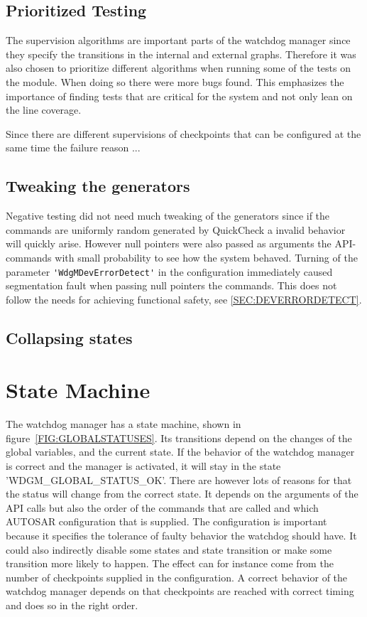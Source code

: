 \subsection{Prioritized Testing}
The supervision algorithms are important parts of the watchdog manager since
they specify the transitions in the internal and external graphs. Therefore it
was also chosen to prioritize different algorithms when running some of the
tests on the module. When doing so there were more bugs found. This emphasizes
the importance of finding tests that are critical for the system and not only
lean on the line coverage.

Since there are different supervisions of checkpoints that can be
configured at the same time the failure reason ...

\subsection{Tweaking the generators}
Negative testing did not need much tweaking of the generators since if
the commands are uniformly random generated by QuickCheck a invalid
behavior will quickly arise. However null pointers were also
passed as arguments the API-commands with small probability to see how
the system behaved. Turning of the parameter
\lstinline!'WdgMDevErrorDetect'! in the configuration immediately caused segmentation
fault when passing null pointers the commands. This does not follow
the needs for achieving functional safety, see \ref{SEC:DEVERRORDETECT}.


\subsection{Collapsing states}



\section{State Machine}
The watchdog manager has a state machine, shown in
figure~\ref{FIG:GLOBALSTATUSES}. Its transitions depend on the changes of the
global variables, and the current state. If the behavior of the watchdog manager
is correct and the manager is activated, it will stay in the state
'WDGM\_GLOBAL\_STATUS\_OK'. There are however lots of reasons for that the
status will change from the correct state. It depends on the arguments of the
API calls but also the order of the commands that are called and which AUTOSAR
configuration that is supplied. The configuration is important because it
specifies the tolerance of faulty behavior the watchdog should have. It could
also indirectly disable some states and state transition or make some
transition more likely to happen. The effect can for instance come from the
number of checkpoints supplied in the configuration. A correct behavior of the
watchdog manager depends on that checkpoints are reached with correct timing
and does so in the right order.

